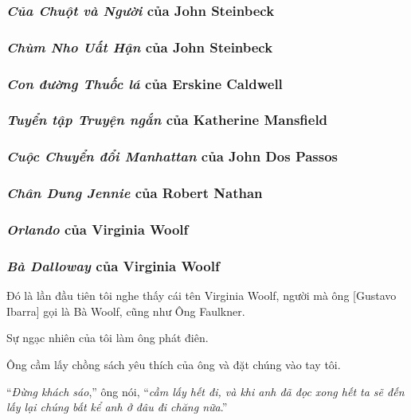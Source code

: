 \documentclass{article}
\begin{document}
\subsubsection{\textit{Của Chuột và Người} của John Steinbeck}

\subsubsection{\textit{Chùm Nho Uất Hận} của John Steinbeck}

\subsubsection{\textit{Con đường Thuốc lá} của Erskine Caldwell}

\subsubsection{\textit{Tuyển tập Truyện ngắn} của Katherine Mansfield}

\subsubsection{\textit{Cuộc Chuyển đổi Manhattan} của John Dos Passos}

\subsubsection{\textit{Chân Dung Jennie} của Robert Nathan}

\subsubsection{\textit{Orlando} của Virginia Woolf}

\subsubsection{\textit{Bà Dalloway} của Virginia Woolf}
Đó là lần đầu tiên tôi nghe thấy cái tên Virginia Woolf, người mà ông [Gustavo Ibarra] gọi là Bà Woolf, cũng như Ông Faulkner.

Sự ngạc nhiên của tôi làm ông phát điên.

Ông cầm lấy chồng sách yêu thích của ông và đặt chúng vào tay tôi.

%
``\textit{Đừng khách sáo},'' ông nói, ``\textit{cầm lấy hết đi, và khi anh đã đọc xong hết ta sẽ đến lấy lại chúng bất kể anh ở đâu đi chăng nữa}.''
\end{document}
